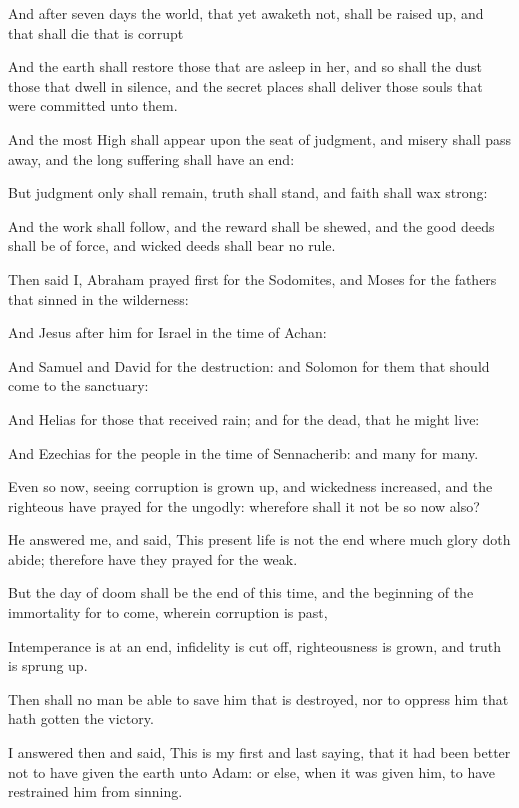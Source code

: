 {\par }{\PP {}And after seven days the world, that yet awaketh not, shall be raised up, and that shall die that is corrupt
\par }{\PP {}And the earth shall restore those that are asleep in her, and so shall the dust those that dwell in silence, and the secret places shall deliver those souls that were committed unto them.
\par }{\PP {}And the most High shall appear upon the seat of judgment, and misery shall pass away, and the long suffering shall have an end:
\par }{\PP {}But judgment only shall remain, truth shall stand, and faith shall wax strong:
\par }{\PP {}And the work shall follow, and the reward shall be shewed, and the good deeds shall be of force, and wicked deeds shall bear no rule.
\par }{\PP {}Then said I, Abraham prayed first for the Sodomites, and Moses for the fathers that sinned in the wilderness:
\par }{\PP {}And Jesus after him for Israel in the time of Achan:
\par }{\PP {}And Samuel and David for the destruction: and Solomon for them that should come to the sanctuary:
\par }{\PP {}And Helias for those that received rain; and for the dead, that he might live:
\par }{\PP {}And Ezechias for the people in the time of Sennacherib: and many for many.
\par }{\PP {}Even so now, seeing corruption is grown up, and wickedness increased, and the righteous have prayed for the ungodly: wherefore shall it not be so now also?
\par }{\PP {}He answered me, and said, This present life is not the end where much glory doth abide; therefore have they prayed for the weak.
\par }{\PP {}But the day of doom shall be the end of this time, and the beginning of the immortality for to come, wherein corruption is past,
\par }{\PP {}Intemperance is at an end, infidelity is cut off, righteousness is grown, and truth is sprung up.
\par }{\PP {}Then shall no man be able to save him that is destroyed, nor to oppress him that hath gotten the victory.
\par }{\PP {}I answered then and said, This is my first and last saying, that it had been better not to have given the earth unto Adam: or else, when it was given him, to have restrained him from sinning.
}
